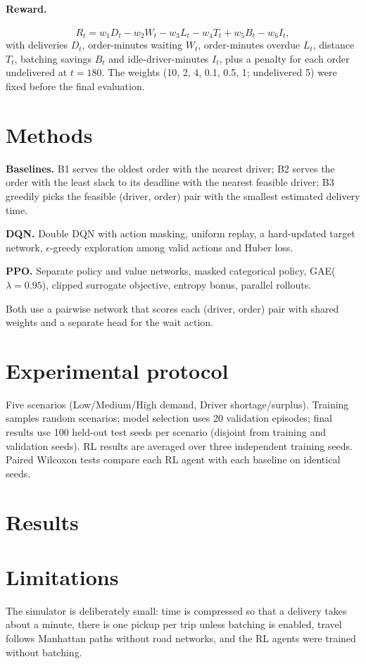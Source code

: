 \documentclass[11pt]{article}
\begin{document}
\paragraph{Reward.}
\[
R_t = w_1 D_t - w_2 W_t - w_3 L_t - w_4 T_t + w_5 B_t - w_6 I_t,
\]
with deliveries $D_t$, order-minutes waiting $W_t$, order-minutes overdue $L_t$, distance $T_t$, batching
savings $B_t$ and idle-driver-minutes $I_t$, plus a penalty for each order undelivered at $t=180$. The weights
(10, 2, 4, 0.1, 0.5, 1; undelivered 5) were fixed before the final evaluation.

\section{Methods}
\textbf{Baselines.} B1 serves the oldest order with the nearest driver; B2 serves the order with the least
slack to its deadline with the nearest feasible driver; B3 greedily picks the feasible (driver, order) pair
with the smallest estimated delivery time.

\textbf{DQN.} Double DQN with action masking, uniform replay, a hard-updated target network,
$\epsilon$-greedy exploration among valid actions and Huber loss.

\textbf{PPO.} Separate policy and value networks, masked categorical policy, GAE($\lambda{=}0.95$),
clipped surrogate objective, entropy bonus, parallel rollouts.

Both use a pairwise network that scores each (driver, order) pair with shared weights and a separate head for the wait action.

\section{Experimental protocol}
Five scenarios (Low/Medium/High demand, Driver shortage/surplus). Training samples random scenarios; model
selection uses 20 validation episodes; final results use 100 held-out test seeds per scenario (disjoint
from training and validation seeds). RL results are averaged over three independent training seeds.
Paired Wilcoxon tests compare each RL agent with each baseline on identical seeds.

\section{Results}


\section{Limitations}
The simulator is deliberately small: time is compressed so that a delivery takes about a minute, there is
one pickup per trip unless batching is enabled, travel follows Manhattan paths without road networks, and
the RL agents were trained without batching.
\end{document}
